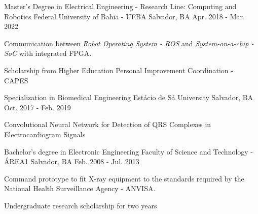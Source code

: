 

\begin{cventries}
  

  \cventry
    {Master's Degree in Electrical Engineering - Research Line: Computing and Robotics} %
    {Federal University of Bahia - UFBA} %
    {Salvador, BA} %
    {Apr. 2018 - Mar. 2022} %
    {
      \begin{cvitems} %
        \item {Communication between \textit{Robot Operating System - ROS} and \textit{System-on-a-chip - SoC} with integrated FPGA.}
        \item {Scholarship from Higher Education Personal Improvement Coordination - CAPES }
      \end{cvitems}
    }


  \cventry
    {Specialization in Biomedical Engineering} %
    {Estácio de Sá University} %
    {Salvador, BA} %
    {Oct. 2017 - Feb. 2019} %
    {
      \begin{cvitems} %
        \item {Convolutional Neural Network for Detection of QRS Complexes in Electrocardiogram Signals}
      \end{cvitems}
    }


  \cventry
    {Bachelor's degree in Electronic Engineering} %
    {Faculty of Science and Technology - ÁREA1} %
    {Salvador, BA} %
    {Feb. 2008 - Jul. 2013} %
    {
      \begin{cvitems} %
        \item {Command prototype to fit X-ray equipment to the standards required by the National Health Surveillance Agency - ANVISA.}
        \item {Undergraduate research scholarship for two years}
      \end{cvitems}
    }


\end{cventries}
